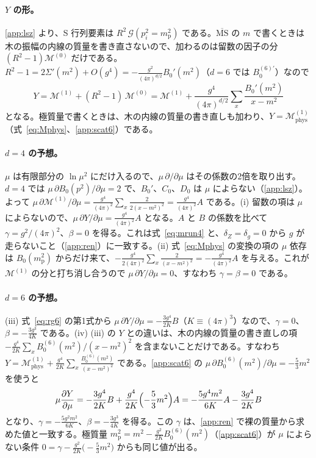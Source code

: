 \documentclass[a4paper,10pt]{ltjsarticle}
\begin{document}
\paragraph{$Y$ の形。}\ref{app:lsz} より、S 行列要素は $R^2\,\mathcal{G}(p_i^2=m_{\mathrm p}^2)$ である。$\overline{\mathrm{MS}}$ の $m$ で書くときは木の振幅の内線の質量を書き直さないので、加わるのは留数の因子の分 $(R^2-1)\mathcal{M}^{(0)}$ だけである。$R^2-1=2\Sigma'(m^2)+O(g^4)=-\frac{g^2}{(4\pi)^{d/2}}B_0'(m^2)$（$d=6$ では $B_0^{(6)\prime}$）なので
\begin{equation*}
Y=\mathcal{M}^{(1)}+(R^2-1)\,\mathcal{M}^{(0)}=\mathcal{M}^{(1)}+\frac{g^4}{(4\pi)^{d/2}}\sum_x\frac{B_0'(m^2)}{x-m^2}
\end{equation*}
となる。極質量で書くときは、木の内線の質量の書き直しも加わり、$Y=\mathcal{M}^{(1)}_{\mathrm{phys}}$（式~\eqref{eq:Mphys}、\ref{app:scat6}）である。

\paragraph{$d=4$ の予想。}$\mu$ は有限部分の $\ln\mu^2$ にだけ入るので、$\mu\,\partial/\partial\mu$ はその係数の2倍を取り出す。$d=4$ では $\mu\,\partial B_0(p^2)/\partial\mu=2$ で、$B_0'$、$C_0$、$D_0$ は $\mu$ によらない（\ref{app:lsz}）。よって $\mu\,\partial\mathcal{M}^{(1)}/\partial\mu=\frac{g^4}{(4\pi)^2}\sum_x\frac{2}{2(x-m^2)^2}=\frac{g^4}{(4\pi)^2}A$ である。(i) 留数の項は $\mu$ によらないので、$\mu\,\partial Y/\partial\mu=\frac{g^4}{(4\pi)^2}A$ となる。$A$ と $B$ の係数を比べて $\gamma=g^2/(4\pi)^2$、$\beta=0$ を得る。これは式~\eqref{eq:mrun4} と、$\delta_Z=\delta_g=0$ から $g$ が走らないこと（\ref{app:ren}）に一致する。(ii) 式~\eqref{eq:Mphys} の変換の項の $\mu$ 依存は $B_0(m_{\mathrm p}^2)$ からだけ来て、$-\frac{g^4}{2(4\pi)^2}\sum_x\frac{2}{(x-m^2)^2}=-\frac{g^4}{(4\pi)^2}A$ を与える。これが $\mathcal{M}^{(1)}$ の分と打ち消し合うので $\mu\,\partial Y/\partial\mu=0$、すなわち $\gamma=\beta=0$ である。

\paragraph{$d=6$ の予想。}(iii) 式~\eqref{eq:rg6} の第1式から $\mu\,\partial Y/\partial\mu=-\frac{3g^4}{2K}B$（$K\equiv(4\pi)^3$）なので、$\gamma=0$、$\beta=-\frac{3g^3}{4K}$ である。(iv) (iii) の $Y$ との違いは、木の内線の質量の書き直しの項 $-\frac{g^4}{2K}\sum_xB_0^{(6)}(m^2)/(x-m^2)^2$ を含まないことだけである。すなわち $Y=\mathcal{M}^{(1)}_{\mathrm{phys}}+\frac{g^4}{2K}\sum_x\frac{B_0^{(6)}(m^2)}{(x-m^2)^2}$ である。\ref{app:scat6} の $\mu\,\partial B_0^{(6)}(m^2)/\partial\mu=-\frac53m^2$ を使うと
\begin{equation*}
\mu\frac{\partial Y}{\partial\mu}=-\frac{3g^4}{2K}B+\frac{g^4}{2K}\Bigl(-\frac53m^2\Bigr)A=-\frac{5g^4m^2}{6K}A-\frac{3g^4}{2K}B
\end{equation*}
となり、$\gamma=-\frac{5g^2m^2}{6K}$、$\beta=-\frac{3g^3}{4K}$ を得る。この $\gamma$ は、\ref{app:ren} で裸の質量から求めた値と一致する。極質量 $m_{\mathrm p}^2=m^2-\frac{g^2}{2K}B_0^{(6)}(m^2)$（\ref{app:scat6}）が $\mu$ によらない条件 $0=\gamma-\frac{g^2}{2K}\bigl(-\frac53m^2\bigr)$ からも同じ値が出る。
\end{document}
